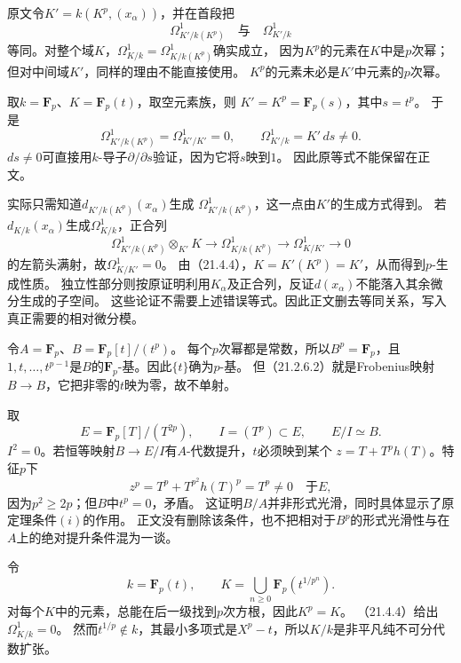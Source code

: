 原文令$K'=k(K^p,(x_\alpha))$，并在首段把
\[
 \Omega^1_{K'/k(K^p)}\quad\text{与}\quad\Omega^1_{K'/k}
\]
等同。对整个域$K$，$\Omega^1_{K/k}=\Omega^1_{K/k(K^p)}$确实成立，
因为$K^p$的元素在$K$中是$p$次幂；但对中间域$K'$，同样的理由不能直接使用。
$K^p$的元素未必是$K'$中元素的$p$次幂。

取$k=\mathbf F_p$、$K=\mathbf F_p(t)$，取空元素族，则
$K'=K^p=\mathbf F_p(s)$，其中$s=t^p$。
于是
\[
 \Omega^1_{K'/k(K^p)}=\Omega^1_{K'/K'}=0,
 \qquad \Omega^1_{K'/k}=K'\,ds\ne0.
\]
$ds\ne0$可直接用$k$-导子$\partial/\partial s$验证，因为它将$s$映到$1$。
因此原等式不能保留在正文。

实际只需知道$d_{K'/k(K^p)}(x_\alpha)$生成
$\Omega^1_{K'/k(K^p)}$，这一点由$K'$的生成方式得到。
若$d_{K/k}(x_\alpha)$生成$\Omega^1_{K/k}$，正合列
\[
 \Omega^1_{K'/k(K^p)}\otimes_{K'}K
 \longrightarrow\Omega^1_{K/k(K^p)}
 \longrightarrow\Omega^1_{K/K'}\longrightarrow0
\]
的左箭头满射，故$\Omega^1_{K/K'}=0$。
由（21.4.4），$K=K'(K^p)=K'$，从而得到$p$-生成性质。
独立性部分则按原证明利用$K_\alpha$及正合列，反证$d(x_\alpha)$不能落入其余微分生成的子空间。
这些论证不需要上述错误等式。因此正文删去等同关系，写入真正需要的相对微分模。

令$A=\mathbf F_p$、$B=\mathbf F_p[t]/(t^p)$。
每个$p$次幂都是常数，所以$B^p=\mathbf F_p$，且
$1,t,\ldots,t^{p-1}$是$B$的$\mathbf F_p$-基。因此$\{t\}$确为$p$-基。
但（21.2.6.2）就是Frobenius映射$B\to B$，它把非零的$t$映为零，故不单射。

取
\[
 E=\mathbf F_p[T]/(T^{2p}),\qquad I=(T^p)\subset E,
 \qquad E/I\simeq B.
\]
$I^2=0$。若恒等映射$B\to E/I$有$A$-代数提升，$t$必须映到某个
$z=T+T^ph(T)$。特征$p$下
\[
 z^p=T^p+T^{p^2}h(T)^p=T^p\ne0\quad\text{于}E,
\]
因为$p^2\ge2p$；但$B$中$t^p=0$，矛盾。
这证明$B/A$并非形式光滑，同时具体显示了原定理条件$(i)$的作用。
正文没有删除该条件，也不把相对于$B^p$的形式光滑性与在$A$上的绝对提升条件混为一谈。

令
\[
 k=\mathbf F_p(t),\qquad
 K=\bigcup_{n\ge0}\mathbf F_p(t^{1/p^n}).
\]
对每个$K$中的元素，总能在后一级找到$p$次方根，因此$K^p=K$。
（21.4.4）给出$\Omega^1_{K/k}=0$。
然而$t^{1/p}\notin k$，其最小多项式是$X^p-t$，所以$K/k$是非平凡纯不可分代数扩张。

